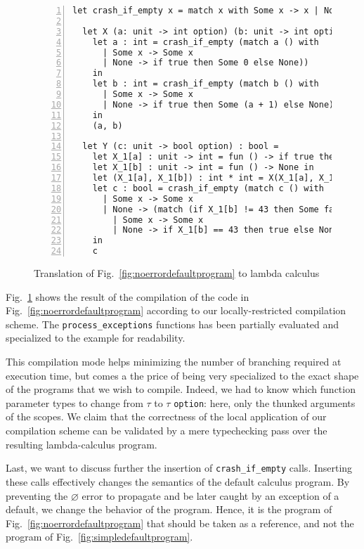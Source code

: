 \documentclass[11pt,a4paper]{article}
\newcommand{\synvar}[1]{\ensuremath{#1}}
\newcommand{\synkeyword}[1]{\textcolor{red!60!black}{\texttt{#1}}}
\newcommand{\synemptydefault}{\synvar{\varnothing}}
\newcommand{\syncrashifempty}{\synkeyword{crash\_if\_empty}}
\begin{document}
\begin{figure}[htb]
  \begin{Verbatim}[frame=lines,label=Simple lambda calculus program, numbers=left, framesep=10pt, samepage=true]
  let crash_if_empty x = match x with Some x -> x | None -> raise Error 
  
  let X (a: unit -> int option) (b: unit -> int option) : (int * int) =
    let a : int = crash_if_empty (match a () with 
      | Some x -> Some x
      | None -> if true then Some 0 else None))
    in
    let b : int = crash_if_empty (match b () with 
      | Some x -> Some x 
      | None -> if true then Some (a + 1) else None)
    in 
    (a, b)
  
  let Y (c: unit -> bool option) : bool = 
    let X_1[a] : unit -> int = fun () -> if true then Some 42 else None in
    let X_1[b] : unit -> int = fun () -> None in 
    let (X_1[a], X_1[b]) : int * int = X(X_1[a], X_1[b]) in 
    let c : bool = crash_if_empty (match c () with  
      | Some x -> Some x 
      | None -> (match (if X_1[b] != 43 then Some false else None) with 
        | Some x -> Some x 
        | None -> if X_1[b] == 43 then true else None))
    in 
    c 
  \end{Verbatim}
  \caption{Translation of Fig.~\ref{fig:noerrordefaultprogram} to lambda calculus
  \label{fig:lambdaprogram}}
  \end{figure}

Fig.~\ref{fig:lambdaprogram} shows the result of the compilation of the code in
Fig.~\ref{fig:noerrordefaultprogram} according to our locally-restricted 
compilation scheme. The \texttt{process\_exceptions} functions has been 
partially evaluated and specialized to the example for readability.

This compilation mode helps minimizing the number of branching required 
at execution time, but comes a the price of being very specialized to the 
exact shape of the programs that we wish to compile. Indeed, we had to 
know which function parameter types to change from \synvar{\tau} to 
\synvar{\tau} \texttt{option}: here, only the thunked arguments of the 
scopes. We claim that the correctness of the local application of our compilation 
scheme can be validated by a mere typechecking pass over the resulting 
lambda-calculus program.

Last, we want to discuss further the insertion of \syncrashifempty{} calls. 
Inserting these calls effectively changes the semantics of the default calculus 
program. By preventing the \synemptydefault{} error to propagate and be later 
caught by an exception of a default, we change the behavior of the program.
Hence, it is the program of Fig.~\ref{fig:noerrordefaultprogram} that 
should be taken as a reference, and not the program of 
Fig.~\ref{fig:simpledefaultprogram}.
\end{document}
